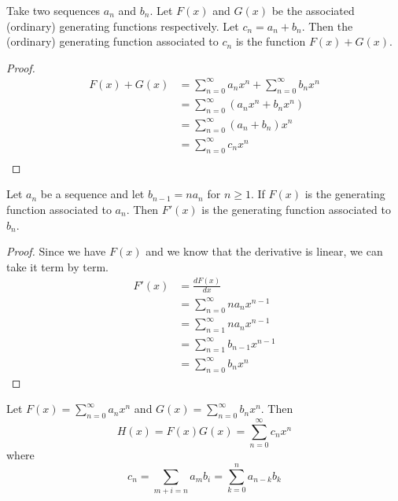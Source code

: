 \begin{theorem}[Linearity]
    Take two sequences $a_n$ and $b_n$. 
    Let $F(x)$ and $G(x)$ be the associated (ordinary) generating functions respectively. 
    Let $c_n=a_n+b_n$. Then the (ordinary) generating function associated to $c_n$ is the function $F(x)+G(x)$.
\end{theorem}
\begin{proof}
    \begin{equation}
        \begin{split}
            F(x)+G(x) &= \sum_{n=0}^{\infty}a_nx^n + \sum_{n=0}^{\infty}b_nx^n\\
            &= \sum_{n=0}^{\infty}(a_nx^n+b_nx^n)\\
            &= \sum_{n=0}^{\infty}(a_n+b_n)x^n\\
            &= \sum_{n=0}^{\infty}c_nx^n\\
        \end{split}
    \end{equation}
\end{proof}

\begin{theorem}[Derivatives]
    Let $a_n$ be a sequence and let $b_{n-1}=na_n$ for $n \geq 1$. 
    If $F(x)$ is the generating function associated to $a_n$. Then $F'(x)$ is the generating function associated to $b_n$.
\end{theorem}
\begin{proof}
    Since we have $F(x)$ and we know that the derivative is linear, we can take it term by term.
    \begin{equation}
        \begin{split}
            F'(x) &= \frac{dF(x)}{dx}\\
            &= \sum_{n=0}^{\infty}na_nx^{n-1}\\
            &= \sum_{n=1}^{\infty}na_nx^{n-1}\\
            &= \sum_{n=1}^{\infty}b_{n-1}x^{n-1}\\
            &= \sum_{n=0}^{\infty}b_nx^n
        \end{split}
    \end{equation}
\end{proof}

\begin{theorem}[Multiplication]
    Let $F(x)=\sum_{n=0}^{\infty}a_nx^n$ and $G(x)=\sum_{n=0}^{\infty}b_nx^n$. 
    Then $$H(x)=F(x)G(x)= \sum_{n=0}^{\infty}c_nx^n$$ where 
    $$c_n=\sum_{m+i=n}a_mb_i=\sum_{k=0}^na_{n-k}b_k$$
\end{theorem}

